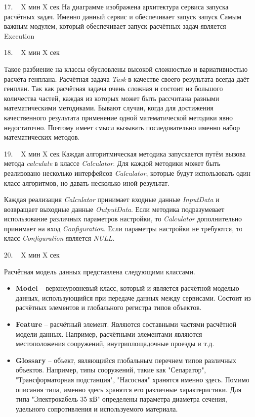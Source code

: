 \documentclass[a4paper,14pt]{extarticle}
\begin{document}
    17. ~ X мин X сек
    На диаграмме изображена архитектура сервиса запуска расчётных задач.
    Именно данный сервис и обеспечивает запуск запуск
    Самым важным модулем, который обеспечивает запуск расчётных задач является Execution

    18. ~ X мин X сек

    Такое разбиение на классы обусловлены высокой сложностью и вариативностью расчёта генплана.
    Расчётная задача \textit{Task} в качестве своего результата всегда даёт генплан.
    Так как расчётная задача очень сложная и состоит из большого количества частей,
    каждая из которых может быть рассчитана разными математическими методиками.
    Бывают случаи, когда для достижения качественного результата применение одной математической методики
    явно недостаточно. Поэтому имеет смысл вызывать последовательно именно набор математических методов.

    19. ~ X мин X сек
    Каждая алгоритмическая методика запускается путём вызова метода \textit{calculate}
    в классе \textit{Calculator}.
    Для каждой методики может быть реализовано несколько интерфейсов \textit{Calculator},
    которые будут использовать один класс алгоритмов, но давать несколько иной результат.

    Каждая реализация \textit{Calculator} принимает входные данные \textit{InputData}
    и возвращает выходные данные \textit{OutputData}.
    Если методика подразумевает использование различных параметров настройки, то \textit{Calculator} дополнительно
    принимает на вход \textit{Configuration}. Если параметры настройки не требуются, то класс \textit{Configuration}
    является \textit{NULL}.

    20. ~ X мин X сек

    Расчётная модель данных представлена следующими классами.
    \begin{itemize}
        \item \textbf{Model} -- верхнеуровневый класс, который и является расчётной моделью данных, использующийся
        при передаче данных между сервисами. Состоит из расчётных элементов и глобального регистра типов объектов.
        \item {
            \textbf{Feature} -- расчётный элемент. Являются составными частями расчётной модели данных. Например, расчётными
            элементами являются местоположения сооружений, внутриплощадочные проезды и т.д.
        }
        \item {
            \textbf{Glossary} -- объект, являющийся глобальным перечнем типов различных объектов.
            Например, типы сооружений, такие как "Сепаратор", "Трансформаторная подстанция", "Насосная" хранятся именно
            здесь. Помимо описания типа, именно здесь хранятся его различные характеристики. Для типа "Электрокабель 35 кВ"
            определены параметра диаметра сечения, удельного сопротивления и используемого материала.
        }
\end{itemize}
\end{document}
